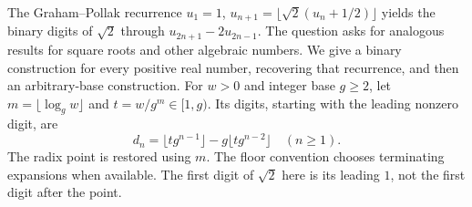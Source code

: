 The Graham--Pollak recurrence $u_1=1$, $u_{n+1}=\lfloor\sqrt2(u_n+1/2)\rfloor$ yields the binary digits of $\sqrt2$ through $u_{2n+1}-2u_{2n-1}$. The question asks for analogous results for square roots and other algebraic numbers. We give a binary construction for every positive real number, recovering that recurrence, and then an arbitrary-base construction.
For $w>0$ and integer base $g\ge2$, let $m=\lfloor\log_g w\rfloor$ and $t=w/g^m\in[1,g)$. Its digits, starting with the leading nonzero digit, are
\[d_n=\lfloor tg^{n-1}\rfloor-g\lfloor tg^{n-2}\rfloor\quad(n\ge1).\tag{1}\]
The radix point is restored using $m$. The floor convention chooses terminating expansions when available. The first digit of $\sqrt2$ here is its leading $1$, not the first digit after the point.
